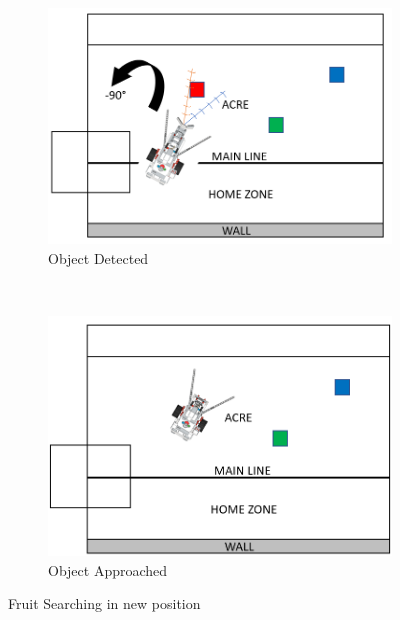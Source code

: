 \begin{figure}[!ht]
	\centering
	\begin{subfigure}[b]{0.45\textwidth}
		\centering
		\includegraphics[width=\textwidth]{Graphics/objectDetected}
		\caption{Object Detected}
		\label{fig:objectDetected}
	\end{subfigure}
	~
	\begin{subfigure}[b]{0.45\textwidth}
		\centering
		\includegraphics[width=\textwidth]{Graphics/objectApproached}
		\caption{Object Approached}
		\label{fig:objectApproached}
	\end{subfigure}
	\caption{Fruit Searching in new position}
	\label{fig:fruitScanning2}
	\vspace{-4mm}
\end{figure}

